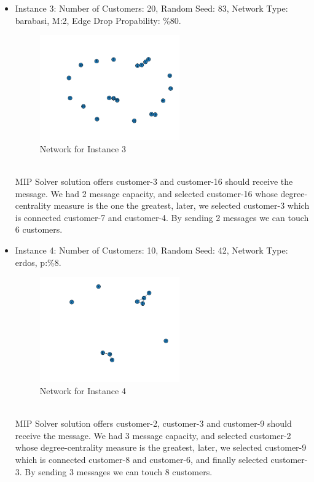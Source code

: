 \documentclass[11pt]{article}
\begin{document}
\begin{itemize}
\\
\item Instance 3: Number of Customers: 20, Random Seed: 83, Network Type: barabasi, M:2, Edge Drop Propability: \%80.
\\
\begin{figure}[htp]
    \centering
    \includegraphics[width=6cm]{micro_world_case_3}
    \caption{Network for Instance 3}
    \label{fig:fig_micro_world_case_3}
\end{figure}
\\
MIP Solver solution offers customer-3 and customer-16 should receive the message.
We had 2 message capacity, and selected customer-16 whose degree-centrality measure is the one the greatest, later, we selected customer-3 which is connected customer-7 and customer-4. By sending 2 messages we can touch 6 customers.
\\
\item Instance 4: Number of Customers: 10, Random Seed: 42, Network Type: erdos, p:\%8.
\\
\begin{figure}[htp]
    \centering
    \includegraphics[width=6cm]{micro_world_case_4}
    \caption{Network for Instance 4}
    \label{fig:fig_micro_world_case_4}
\end{figure}
\\
MIP Solver solution offers customer-2, customer-3 and customer-9 should receive the message.
We had 3 message capacity, and selected customer-2 whose degree-centrality measure is the greatest, later, we selected customer-9 which is connected customer-8 and customer-6, and finally selected customer-3. By sending 3 messages we can touch 8 customers.

\end{itemize}
\end{document}
